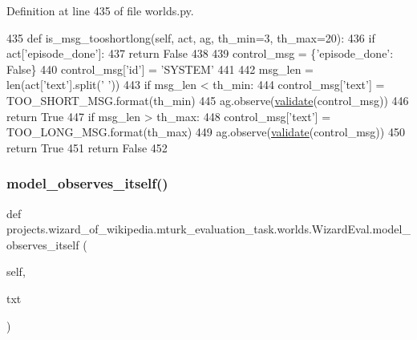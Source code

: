 Definition at line 435 of file worlds.\+py.


\begin{DoxyCode}
435     \textcolor{keyword}{def }is\_msg\_tooshortlong(self, act, ag, th\_min=3, th\_max=20):
436         \textcolor{keywordflow}{if} act[\textcolor{stringliteral}{'episode\_done'}]:
437             \textcolor{keywordflow}{return} \textcolor{keyword}{False}
438 
439         control\_msg = \{\textcolor{stringliteral}{'episode\_done'}: \textcolor{keyword}{False}\}
440         control\_msg[\textcolor{stringliteral}{'id'}] = \textcolor{stringliteral}{'SYSTEM'}
441 
442         msg\_len = len(act[\textcolor{stringliteral}{'text'}].split(\textcolor{stringliteral}{' '}))
443         \textcolor{keywordflow}{if} msg\_len < th\_min:
444             control\_msg[\textcolor{stringliteral}{'text'}] = TOO\_SHORT\_MSG.format(th\_min)
445             ag.observe(\hyperlink{namespaceparlai_1_1core_1_1worlds_afc3fad603b7bce41dbdc9cdc04a9c794}{validate}(control\_msg))
446             \textcolor{keywordflow}{return} \textcolor{keyword}{True}
447         \textcolor{keywordflow}{if} msg\_len > th\_max:
448             control\_msg[\textcolor{stringliteral}{'text'}] = TOO\_LONG\_MSG.format(th\_max)
449             ag.observe(\hyperlink{namespaceparlai_1_1core_1_1worlds_afc3fad603b7bce41dbdc9cdc04a9c794}{validate}(control\_msg))
450             \textcolor{keywordflow}{return} \textcolor{keyword}{True}
451         \textcolor{keywordflow}{return} \textcolor{keyword}{False}
452 
\end{DoxyCode}
\mbox{\label{classprojects_1_1wizard__of__wikipedia_1_1mturk__evaluation__task_1_1worlds_1_1WizardEval_a57f678d93fee85fb988fce00c22560d5}} 
\subsubsection{\texorpdfstring{model\+\_\+observes\+\_\+itself()}{model\_observes\_itself()}}
{\footnotesize\ttfamily def projects.\+wizard\+\_\+of\+\_\+wikipedia.\+mturk\+\_\+evaluation\+\_\+task.\+worlds.\+Wizard\+Eval.\+model\+\_\+observes\+\_\+itself (\begin{DoxyParamCaption}\item[{}]{self,  }\item[{}]{txt }\end{DoxyParamCaption})}



